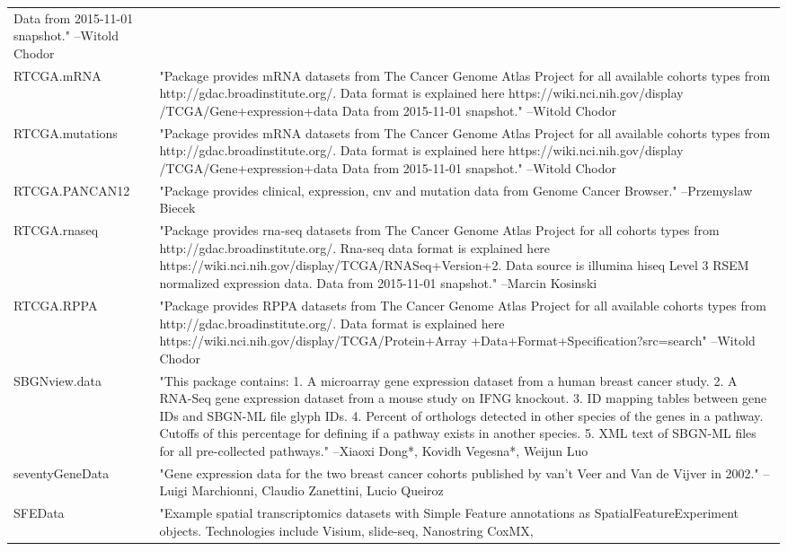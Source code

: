 \begin{longtable}[t]{l>{\raggedright\arraybackslash}p{25em}}
Data from 2015-11-01 snapshot." --Witold \vphantom{1} Chodor\\
RTCGA.mRNA & "Package provides mRNA datasets from The Cancer Genome
Atlas Project for all available cohorts types from
http://gdac.broadinstitute.org/. Data format is explained here
https://wiki.nci.nih.gov/display /TCGA/Gene+expression+data Data
from 2015-11-01 snapshot." --Witold Chodor\\
RTCGA.mutations & "Package provides mRNA datasets from The Cancer Genome
Atlas Project for all available cohorts types from
http://gdac.broadinstitute.org/. Data format is explained here
https://wiki.nci.nih.gov/display /TCGA/Gene+expression+data Data
from 2015-11-01 snapshot." --Witold Chodor\\
RTCGA.PANCAN12 & "Package provides clinical, expression, cnv and mutation
data from Genome Cancer Browser." --Przemyslaw Biecek\\
\addlinespace
RTCGA.rnaseq & "Package provides rna-seq datasets from The Cancer Genome
Atlas Project for all cohorts types from
http://gdac.broadinstitute.org/. Rna-seq data format is
explained here
https://wiki.nci.nih.gov/display/TCGA/RNASeq+Version+2. Data
source is illumina hiseq Level 3 RSEM normalized expression
data. Data from 2015-11-01 snapshot." --Marcin Kosinski\\
RTCGA.RPPA & "Package provides RPPA datasets from The Cancer Genome
Atlas Project for all available cohorts types from
http://gdac.broadinstitute.org/. Data format is explained here
https://wiki.nci.nih.gov/display/TCGA/Protein+Array
+Data+Format+Specification?src=search" --Witold Chodor\\
SBGNview.data & "This package contains: 1. A microarray gene expression
dataset from a human breast cancer study. 2. A RNA-Seq gene
expression dataset from a mouse study on IFNG knockout. 3. ID
mapping tables between gene IDs and SBGN-ML file glyph IDs. 4.
Percent of orthologs detected in other species of the genes in
a pathway. Cutoffs of this percentage for defining if a pathway
exists in another species. 5. XML text of SBGN-ML files for all
pre-collected pathways." --Xiaoxi Dong*, Kovidh Vegesna*, Weijun Luo\\
seventyGeneData & "Gene expression data for the two breast cancer cohorts
published by van't Veer and Van de Vijver in 2002." --Luigi Marchionni, Claudio Zanettini, Lucio Queiroz\\
SFEData & "Example spatial transcriptomics datasets with Simple
Feature annotations as SpatialFeatureExperiment objects.
Technologies include Visium, slide-seq, Nanostring CoxMX,

\end{longtable}
